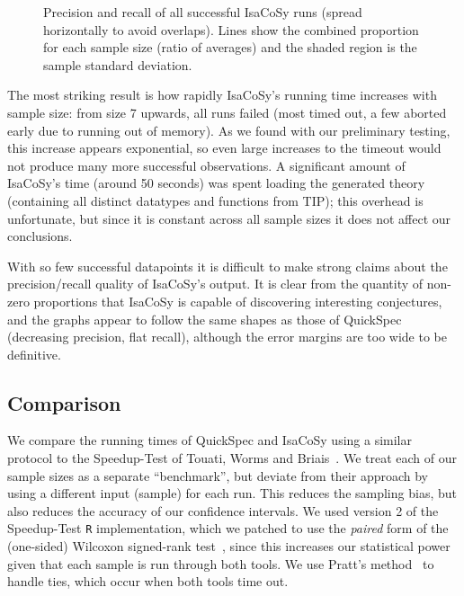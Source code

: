 \begin{figure}
  \centering
  
  \caption{Precision and recall of all successful IsaCoSy runs (spread
    horizontally to avoid overlaps). Lines show the combined proportion for each
    sample size (ratio of averages) and the shaded region is the sample standard
    deviation.}
  \label{figure:isacosy_precRec}
\end{figure}

The most striking result is how rapidly IsaCoSy's running time increases with
sample size: from size 7 upwards, all runs failed (most timed out, a few aborted
early due to running out of memory). As we found with our preliminary testing,
this increase appears exponential, so even large increases to the timeout would
not produce many more successful observations. A significant amount of IsaCoSy's
time (around 50 seconds) was spent loading the generated theory (containing all
distinct datatypes and functions from TIP); this overhead is unfortunate, but
since it is constant across all sample sizes it does not affect our conclusions.

With so few successful datapoints it is difficult to make strong claims about
the precision/recall quality of IsaCoSy's output. It is clear from the quantity
of non-zero proportions that IsaCoSy is capable of discovering interesting
conjectures, and the graphs appear to follow the same shapes as those of
QuickSpec (decreasing precision, flat recall), although the error margins are
too wide to be definitive.

\subsection{Comparison}

We compare the running times of QuickSpec and IsaCoSy using a similar protocol
to the Speedup-Test of Touati, Worms and Briais~\cite{touati2013speedup}. We
treat each of our sample sizes as a separate ``benchmark'', but deviate from
their approach by using a different input (sample) for each run. This reduces
the sampling bias, but also reduces the accuracy of our confidence intervals.
We used version 2 of the Speedup-Test \texttt{R} implementation, which we
patched to use the \emph{paired} form of the (one-sided) Wilcoxon signed-rank
test~\cite{wilcoxon1945individual}, since this increases our statistical power
given that each sample is run through both tools. We use Pratt's
method~\cite{pratt1959remarks} to handle ties, which occur when both tools time
out.

